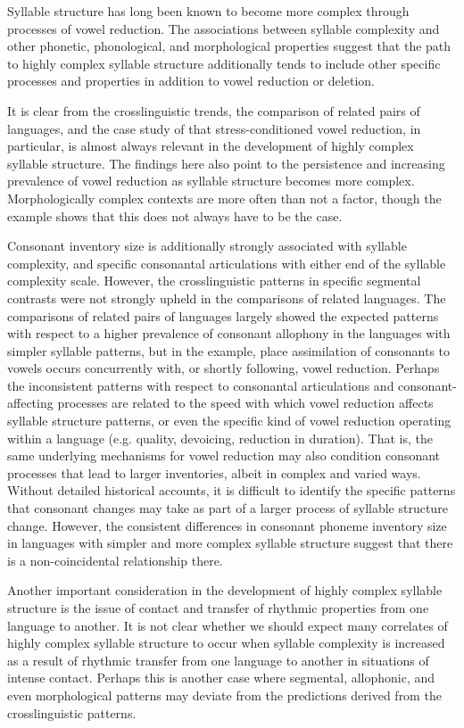   Syllable structure has long been known to become more complex through processes of vowel reduction. The associations between syllable complexity and other phonetic, phonological, and morphological properties suggest that the path to highly complex syllable structure additionally tends to include other specific processes and properties in addition to vowel reduction or deletion.

  It is clear from the crosslinguistic trends, the comparison of related pairs of languages, and the case study of  that stress-conditioned vowel reduction, in particular, is almost always relevant in the development of highly complex syllable structure. The findings here also point to the persistence and increasing prevalence of vowel reduction as syllable structure becomes more complex. Morphologically complex contexts are more often than not a factor, though the  example shows that this does not always have to be the case.

  Consonant inventory size is additionally strongly associated with syllable complexity, and specific consonantal articulations with either end of the syllable complexity scale. However, the crosslinguistic patterns in specific segmental contrasts were not strongly upheld in the comparisons of related languages. The comparisons of related pairs of languages largely showed the expected patterns with respect to a higher prevalence of consonant allophony in the languages with simpler syllable patterns, but in the  example, place assimilation of consonants to vowels occurs concurrently with, or shortly following, vowel reduction. Perhaps the inconsistent patterns with respect to consonantal articulations and consonant-affecting processes are related to the speed with which vowel reduction affects syllable structure patterns, or even the specific kind of vowel reduction operating within a language (e.g. quality, devoicing, reduction in duration). That is, the same underlying mechanisms for vowel reduction may also condition consonant processes that lead to larger inventories, albeit in complex and varied ways. Without detailed historical accounts, it is difficult to identify the specific patterns that consonant changes may take as part of a larger process of syllable structure change. However, the consistent differences in consonant phoneme inventory size in languages with simpler and more complex syllable structure suggest that there is a non-coincidental relationship there.

  Another important consideration in the development of highly complex syllable structure is the issue of contact and transfer of rhythmic properties from one language to another. It is not clear whether we should expect many correlates of highly complex syllable structure to occur when syllable complexity is increased as a result of rhythmic transfer from one language to another in situations of intense contact. Perhaps this is another case where segmental, allophonic, and even morphological patterns may deviate from the predictions derived from the crosslinguistic patterns.

